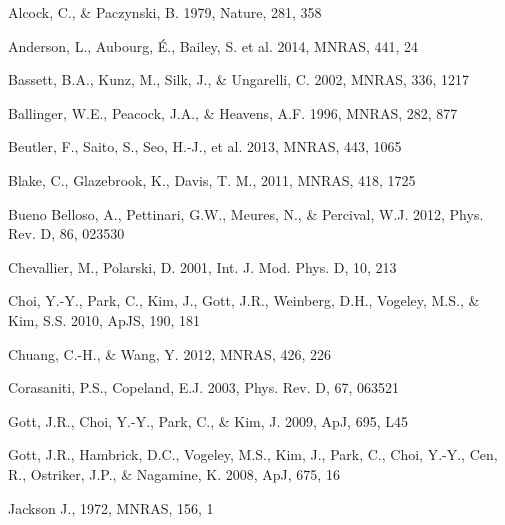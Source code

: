 \documentclass[useAMS,usenatbib]{mnras}
\begin{document}
\begin{thebibliography}{}

Alcock, C., \& Paczynski, B. 1979, Nature, 281, 358  

Anderson, L., Aubourg, \'E., Bailey, S. et al. 2014, MNRAS, 441, 24  


Bassett, B.A., Kunz, M., Silk, J., \& Ungarelli, C. 2002, MNRAS, 336, 1217

Ballinger, W.E., Peacock, J.A., \& Heavens, A.F. 1996, MNRAS, 282, 877  


Beutler, F., Saito, S., Seo, H.-J., et al. 2013, MNRAS, 443, 1065

Blake, C., Glazebrook, K., Davis, T. M., 2011, MNRAS, 418, 1725  


Bueno Belloso, A., Pettinari, G.W., Meures, N., \& Percival, W.J. 2012, Phys. Rev. D, 86, 023530

Chevallier, M., Polarski, D. 2001, Int. J. Mod. Phys. D, 10, 213


Choi, Y.-Y., Park, C., Kim, J., Gott, J.R., 
Weinberg, D.H., Vogeley, M.S., \& Kim, S.S. 2010, ApJS, 190, 181  


Chuang, C.-H., \& Wang, Y. 2012, MNRAS, 426, 226  

Corasaniti, P.S., Copeland, E.J. 2003, Phys. Rev. D, 67, 063521


Gott, J.R., Choi, Y.-Y., Park, C., \& Kim, J. 2009, ApJ, 695, L45  

Gott, J.R., Hambrick, D.C., Vogeley, M.S., Kim, J., Park, C., Choi, Y.-Y.,
Cen, R., Ostriker, J.P., \& Nagamine, K. 2008, ApJ, 675, 16  

Jackson J., 1972, MNRAS, 156, 1


\end{thebibliography}
\end{document}
